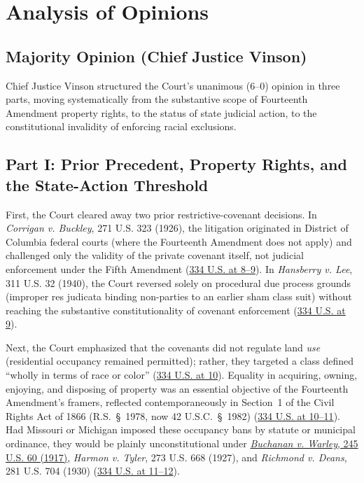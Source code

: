 \documentclass[12pt]{article}
\begin{document}
\section{Analysis of Opinions}
\subsection{Majority Opinion (Chief Justice Vinson)}

Chief Justice Vinson structured the Court's unanimous (6--0) opinion in three parts, moving systematically from the substantive scope of Fourteenth Amendment property rights, to the status of state judicial action, to the constitutional invalidity of enforcing racial exclusions.

\subsection{Part I: Prior Precedent, Property Rights, and the State-Action Threshold}
First, the Court cleared away two prior restrictive-covenant decisions. In \textit{Corrigan v. Buckley}, 271 U.S. 323 (1926), the litigation originated in District of Columbia federal courts (where the Fourteenth Amendment does not apply) and challenged only the validity of the private covenant itself, not judicial enforcement under the Fifth Amendment (\href{https://supreme.justia.com/cases/federal/us/334/1/}{334 U.S. at 8--9}). In \textit{Hansberry v. Lee}, 311 U.S. 32 (1940), the Court reversed solely on procedural due process grounds (improper res judicata binding non-parties to an earlier sham class suit) without reaching the substantive constitutionality of covenant enforcement (\href{https://supreme.justia.com/cases/federal/us/334/1/}{334 U.S. at 9}).

Next, the Court emphasized that the covenants did not regulate land \textit{use} (residential occupancy remained permitted); rather, they targeted a class defined ``wholly in terms of race or color'' (\href{https://supreme.justia.com/cases/federal/us/334/1/}{334 U.S. at 10}). Equality in acquiring, owning, enjoying, and disposing of property was an essential objective of the Fourteenth Amendment's framers, reflected contemporaneously in Section~1 of the Civil Rights Act of 1866 (R.S.~\S~1978, now 42 U.S.C.~\S~1982) (\href{https://supreme.justia.com/cases/federal/us/334/1/}{334 U.S. at 10--11}). Had Missouri or Michigan imposed these occupancy bans by statute or municipal ordinance, they would be plainly unconstitutional under \href{https://supreme.justia.com/cases/federal/us/245/60/}{\textit{Buchanan v. Warley}, 245 U.S. 60 (1917)}, \textit{Harmon v. Tyler}, 273 U.S. 668 (1927), and \textit{Richmond v. Deans}, 281 U.S. 704 (1930) (\href{https://supreme.justia.com/cases/federal/us/334/1/}{334 U.S. at 11--12}).
\end{document}
